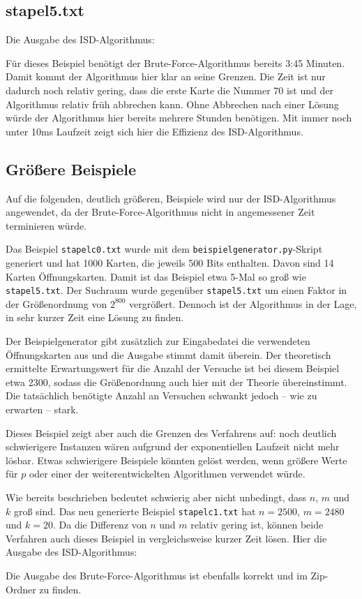 \documentclass[a4paper,10pt,ngerman]{scrartcl}
\begin{document}
\subsection*{stapel5.txt}
Die Ausgabe des ISD-Algorithmus:

Für dieses Beispiel benötigt der Brute-Force-Algorithmus bereits 3:45 Minuten. Damit kommt der Algorithmus hier klar an seine Grenzen. Die Zeit ist nur dadurch noch relativ gering, dass die erste Karte die Nummer 70 ist und der Algorithmus relativ früh abbrechen kann. Ohne Abbrechen nach einer Lösung würde der Algorithmus hier bereits mehrere Stunden benötigen.
Mit immer noch unter 10ms Laufzeit zeigt sich hier die Effizienz des ISD-Algorithmus.
\subsection{Größere Beispiele}
Auf die folgenden, deutlich größeren, Beispiele wird nur der ISD-Algorithmus angewendet, da der Brute-Force-Algorithmus nicht in angemessener Zeit terminieren würde.

Das Beispiel \lstinline{stapelc0.txt} wurde mit dem \lstinline{beispielgenerator.py}-Skript generiert und hat 1000 Karten, die jeweils 500 Bits enthalten. Davon sind 14 Karten Öffnungskarten. Damit ist das Beispiel etwa 5-Mal so groß wie \lstinline{stapel5.txt}. Der Suchraum wurde gegenüber \lstinline{stapel5.txt} um einen Faktor in der Größenordnung von $2^{800}$ vergrößert. Dennoch ist der Algorithmus in der Lage, in sehr kurzer Zeit eine Lösung zu finden.

Der Beispielgenerator gibt zusätzlich zur Eingabedatei die verwendeten Öffnungskarten aus und die Ausgabe stimmt damit überein. 
Der theoretisch ermittelte Erwartungswert für die Anzahl der Versuche ist bei diesem Beispiel etwa 2300, sodass die Größenordnung auch hier mit der Theorie übereinstimmt. Die tatsächlich benötigte Anzahl an Versuchen schwankt jedoch -- wie zu erwarten -- stark.

Dieses Beispiel zeigt aber auch die Grenzen des Verfahrens auf: noch deutlich schwierigere Instanzen wären aufgrund der exponentiellen Laufzeit nicht mehr lösbar. Etwas schwierigere Beispiele könnten gelöst werden, wenn größere Werte für $p$ oder einer der weiterentwickelten Algorithmen verwendet würde.

Wie bereits beschrieben bedeutet schwierig aber nicht unbedingt, dass $n$, $m$ und $k$ groß sind. 
Das neu generierte Beispiel \lstinline{stapelc1.txt} hat $n = 2500$, $m = 2480$ und $k = 20$. 
Da die Differenz von $n$ und $m$ relativ gering ist, können beide Verfahren auch dieses Beispiel in vergleichsweise kurzer Zeit lösen. Hier die Ausgabe des ISD-Algorithmus:

Die Ausgabe des Brute-Force-Algorithmus ist ebenfalls korrekt und im Zip-Ordner zu finden.
\end{document}
